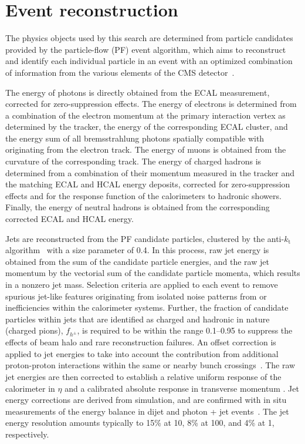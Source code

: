 \section{Event reconstruction}
\label{sec:reconstruction}

The physics objects used by this search are determined from particle
candidates provided by the particle-flow (PF) event algorithm, which
aims to reconstruct and identify each individual particle in an event
with an optimized combination of information from the various elements
of the CMS detector~\cite{CMS-PAS-PFT-09-001, CMS-PAS-PFT-10-001}.

The energy of photons is directly obtained from the ECAL measurement,
corrected for zero-suppression effects. The energy of electrons is
determined from a combination of the electron momentum at the primary
interaction vertex as determined by the tracker, the energy of the
corresponding ECAL cluster, and the energy sum of all bremsstrahlung
photons spatially compatible with originating from the electron
track. The energy of muons is obtained from the curvature of the
corresponding track. The energy of charged hadrons is determined from
a combination of their momentum measured in the tracker and the
matching ECAL and HCAL energy deposits, corrected for zero-suppression
effects and for the response function of the calorimeters to hadronic
showers. Finally, the energy of neutral hadrons is obtained from the
corresponding corrected ECAL and HCAL energy.

Jets are reconstructed from the PF candidate particles, clustered by
the anti-$k_\mathrm{t}$ algorithm~\cite{Cacciari:2008gp,
  Cacciari:2011ma} with a size parameter of 0.4. In this process, raw
jet energy is obtained from the sum of the candidate particle
energies, and the raw jet momentum by the vectorial sum of the
candidate particle momenta, which results in a nonzero jet
mass. Selection criteria are applied to each event to remove spurious
jet-like features originating from isolated noise patterns from or
inefficiencies within the calorimeter systems. Further, the fraction
of candidate particles within jets that are identified as charged and
hadronic in nature (\eg charged pions), $f_{h^{\pm}}$, is required to
be within the range 0.1--0.95 to suppress the effects of beam halo and
rare reconstruction failures. An offset correction is applied to jet
energies to take into account the contribution from additional
proton-proton interactions within the same or nearby bunch
crossings~\cite{pileup}.  The raw jet energies are then corrected to
establish a relative uniform response of the calorimeter in $\eta$ and
a calibrated absolute response in transverse momentum \pt. Jet energy
corrections are derived from simulation, and are confirmed with in
situ measurements of the energy balance in dijet and photon + jet
events~\cite{Chatrchyan:2011ds}. The jet energy resolution amounts
typically to 15\% at 10\GeV, 8\% at 100\GeV, and 4\% at 1\TeV,
respectively.

